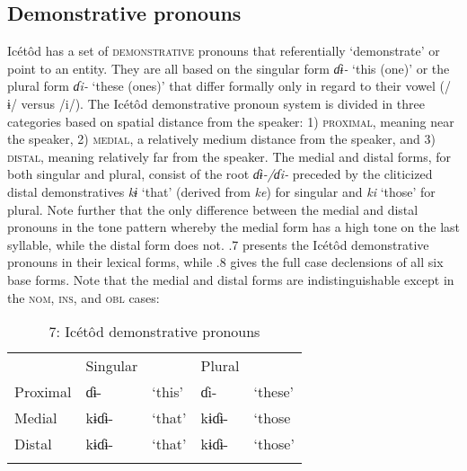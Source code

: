 \subsection{Demonstrative pronouns}


Icétôd has a set of \textsc{demonstrative} pronouns that referentially ‘demonstrate’ or point to an entity. They are all based on the singular form \textit{ɗɨ{}-} ‘this (one)’ or the plural form \textit{ɗi-} ‘these (ones)’ that differ formally only in regard to their vowel (/ɨ/ versus /i/). The Icétôd demonstrative pronoun system is divided in three categories based on spatial distance from the speaker: 1) \textsc{proximal}, meaning near the speaker, 2) \textsc{medial}, a relatively medium distance from the speaker, and 3) \textsc{distal}, meaning relatively far from the speaker. The medial and distal forms, for both singular and plural, consist of the root \textit{ɗɨ{}-/ɗi-} preceded by the cliticized distal demonstratives \textit{kɨ} ‘that’ (derived from \textit{ke}) for singular and \textit{ki} ‘those’ for plural. Note further that the only difference between the medial and distal pronouns in the tone pattern whereby the medial form has a high tone on the last syllable, while the distal form does not. .7 presents the Icétôd demonstrative pronouns in their lexical forms, while .8 gives the full case declensions of all six base forms. Note that the medial and distal forms are indistinguishable except in the \textsc{nom}, \textsc{ins}, and \textsc{obl} cases:


\begin{table}
\caption{7: Icétôd demonstrative pronouns}
\label{tab:5}


\begin{tabularx}{\textwidth}{XXXXX} & Singular &  & Plural & \\
\lsptoprule
Proximal & ɗɨ{}- & ‘this’ & ɗi- & ‘these’\\
Medial & kɨɗɨ- & ‘that’ & kɨɗɨ- & ‘those\\
Distal & kɨɗɨ- & ‘that’ & kɨɗɨ- & ‘those’\\
\lspbottomrule
\end{tabularx}
\end{table}

